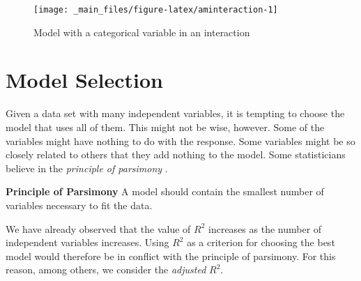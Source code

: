 \documentclass[
]{book}
\newenvironment{Shaded}{\begin{snugshade}}{\end{snugshade}}
\newcommand{\AttributeTok}[1]{\textcolor[rgb]{0.13,0.29,0.53}{#1}}
\newcommand{\CommentTok}[1]{\textcolor[rgb]{0.56,0.35,0.01}{\textit{#1}}}
\newcommand{\FunctionTok}[1]{\textcolor[rgb]{0.13,0.29,0.53}{\textbf{#1}}}
\newcommand{\NormalTok}[1]{#1}
\newcommand{\OtherTok}[1]{\textcolor[rgb]{0.56,0.35,0.01}{#1}}
\newcommand{\SpecialCharTok}[1]{\textcolor[rgb]{0.81,0.36,0.00}{\textbf{#1}}}
\newcommand{\StringTok}[1]{\textcolor[rgb]{0.31,0.60,0.02}{#1}}
\theoremstyle{definition}
\theoremstyle{definition}
\theoremstyle{definition}
\theoremstyle{definition}
\theoremstyle{remark}
\begin{document}
\begin{Shaded}
\end{Shaded}

\begin{figure}

{\centering \texttt{[image: \_main\_files/figure-latex/aminteraction-1]} 

}

\caption{Model with a categorical variable in an interaction}\label{fig:aminteraction}
\end{figure}

\section{Model Selection}\label{model-selection}

Given a data set with many independent variables, it is tempting to choose the model that uses all of them. This might not be wise, however. Some of the variables might have nothing to do with the response. Some variables might be so closely related to others that they add nothing to the model. Some statisticians believe in the \emph{principle of parsimony} \autocite{Navidi}.

\begin{notebox}
\textbf{Principle of Parsimony}
A model should contain the smallest number of variables necessary to fit the data.

\end{notebox}

We have already observed that the value of \(R^2\) increases as the number of independent variables increases. Using \(R^2\) as a criterion for choosing the best model would therefore be in conflict with the principle of parsimony. For this reason, among others, we consider the \emph{adjusted} \(R^2\).
\end{document}
